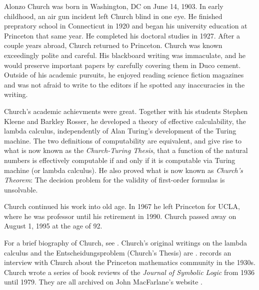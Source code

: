 \documentclass[../../../include/open-logic-section]{subfiles}
\begin{document}



Alonzo Church was born in Washington, DC on June 14, 1903.  In early
childhood, an air gun incident left Church blind in one eye. He
finished prepratory school in Connecticut in 1920 and began his
university education at Princeton that same year. He completed his
doctoral studies in 1927. After a couple years abroad, Church returned
to Princeton. Church was known exceedingly polite and careful. His
blackboard writing was immaculate, and he would preserve important
papers by carefully covering them in Duco cement. Outside of his
academic pursuits, he enjoyed reading science fiction magazines and
was not afraid to write to the editors if he spotted any inaccuracies
in the writing.

Church's academic achievments were great.  Together with his students
Stephen Kleene and Barkley Rosser, he developed a theory of effective
calculability, the lambda calculus, independently of Alan Turing's
development of the Turing machine. The two definitions of
computability are equivalent, and give rise to what is now known as
the \emph{Church-Turing Thesis}, that a function of the natural
numbers is effectively computable if and only if it is computable via
Turing machine (or lambda calculus). He also proved what is now known
as \emph{Church's Theorem}: The decision problem for the validity of
first-order formulas is unsolvable.

Church continued his work into old age. In 1967 he left Princeton for
UCLA, where he was professor until his retirement in 1990. Church
passed away on August 1, 1995 at the age of 92.

\begin{reading} 
For a brief biography of Church, see \citet{EndertonND}.  Church's
original writings on the lambda calculus and the Entscheidungsproblem
(Church's Thesis) are \citet{Church1936,Church1936a}.
\citet{Aspray1984} records an interview with Church about the
Princeton mathematics community in the 1930s.
Church wrote a series of book reviews of the \emph{Journal of
Symbolic Logic} from 1936 until 1979. They are all archived on John
MacFarlane's website \citep{MacFarlane2015}.
\end{reading} 
\end{document}
